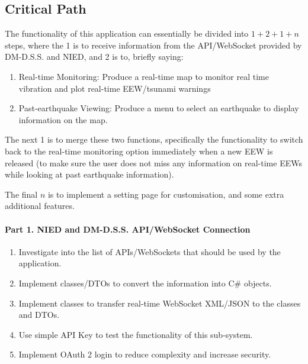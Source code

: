 \documentclass[10pt]{article}
\begin{document}
\subsection{Critical Path}

The functionality of this application can essentially be divided into \(1+2+1+n\) steps, where the 1 is to receive information from the API/WebSocket provided by DM-D.S.S. and NIED, and 2 is to, briefly saying:
\begin{enumerate}
    \item Real-time Monitoring: Produce a real-time map to monitor real time vibration and plot real-time EEW/tsunami warnings
    \item Past-earthquake Viewing: Produce a menu to select an earthquake to display information on the map.
\end{enumerate}

The next 1 is to merge these two functions, specifically the functionality to switch back to the real-time monitoring option immediately when a new EEW is released (to make sure the user does not miss any information on real-time EEWs while looking at past earthquake information).

The final \(n\) is to implement a setting page for customisation, and some extra additional features.

\bigskip

\paragraph{Part 1. NIED and DM-D.S.S. API/WebSocket Connection}
\begin{enumerate}
    \item Investigate into the list of APIs/WebSockets that should be used by the application.
    \item Implement classes/DTOs to convert the information into C\# objects.
    \item Implement classes to transfer real-time WebSocket XML/JSON to the classes and DTOs.
    \item Use simple API Key to test the functionality of this sub-system.
    \item Implement OAuth 2 login to reduce complexity and increase security.
\end{enumerate}
\end{document}
